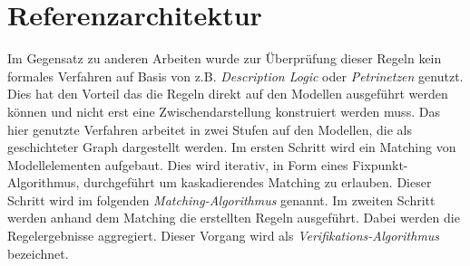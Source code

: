 \section{Referenzarchitektur}

Im Gegensatz zu anderen Arbeiten wurde zur Überprüfung dieser Regeln kein formales Verfahren auf Basis von z.B. \emph{Description Logic} oder \emph{Petrinetzen} genutzt.
Dies hat den Vorteil das die Regeln direkt auf den Modellen ausgeführt werden können und nicht erst eine Zwischendarstellung konstruiert werden muss.
Das hier genutzte Verfahren arbeitet in zwei Stufen auf den Modellen, die als geschichteter Graph dargestellt werden.
Im ersten Schritt wird ein Matching von Modellelementen aufgebaut.
Dies wird iterativ, in Form eines Fixpunkt-Algorithmus, durchgeführt um kaskadierendes Matching zu erlauben.
Dieser Schritt wird im folgenden \emph{Matching-Algorithmus} genannt.
Im zweiten Schritt werden anhand dem Matching die erstellten Regeln ausgeführt.
Dabei werden die Regelergebnisse aggregiert.
Dieser Vorgang wird als \emph{Verifikations-Algorithmus} bezeichnet.

